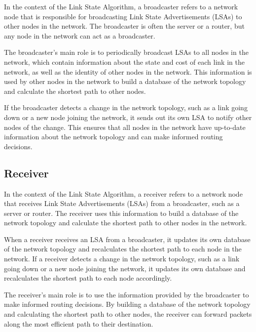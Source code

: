 \documentclass[11pt]{article}
\begin{document}
In the context of the Link State Algorithm, a broadcaster refers to a network node that is responsible for broadcasting Link State Advertisements (LSAs) to other nodes in the network. The broadcaster is often the server or a router, but any node in the network can act as a broadcaster.

The broadcaster's main role is to periodically broadcast LSAs to all nodes in the network, which contain information about the state and cost of each link in the network, as well as the identity of other nodes in the network. This information is used by other nodes in the network to build a database of the network topology and calculate the shortest path to other nodes.

If the broadcaster detects a change in the network topology, such as a link going down or a new node joining the network, it sends out its own LSA to notify other nodes of the change. This ensures that all nodes in the network have up-to-date information about the network topology and can make informed routing decisions.


\subsection{Receiver}

In the context of the Link State Algorithm, a receiver refers to a network node that receives Link State Advertisements (LSAs) from a broadcaster, such as a server or router. The receiver uses this information to build a database of the network topology and calculate the shortest path to other nodes in the network.

When a receiver receives an LSA from a broadcaster, it updates its own database of the network topology and recalculates the shortest path to each node in the network. If a receiver detects a change in the network topology, such as a link going down or a new node joining the network, it updates its own database and recalculates the shortest path to each node accordingly.

The receiver's main role is to use the information provided by the broadcaster to make informed routing decisions. By building a database of the network topology and calculating the shortest path to other nodes, the receiver can forward packets along the most efficient path to their destination.
\end{document}
